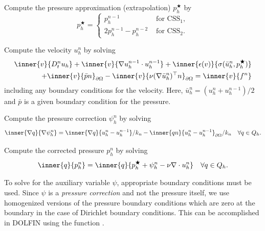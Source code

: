 {
\item
  Compute the pressure approximation (extrapolation)
  $p_h^{\bigstar}$ by
  \begin{equation}\label{eq:css,1a}
    p_h^{\bigstar} =
    \left\{
    \begin{array}{ll}
      p_h^{n-1} & \mbox{ for } \mathrm{CSS}_1, \\
      2 p_h^{n-1} - p_h^{n-2} & \mbox{ for } \mathrm{CSS}_2.
    \end{array}
    \right.
  \end{equation}

\item
  Compute the velocity $u_h^n$ by solving
  \begin{equation}\label{eq:css,2}
    \begin{split}
      \inner{v}{D_t^n u_h}
      + \inner{v}{\nabla u_h^{n-1} \cdot u_h^{n-1}}
      + \inner{\epsilon(v)}{\sigma(\bar{u}_h^n, p_h^{\bigstar})} \\
      + \inner{v}{\bar{p} n}_{\partial\Omega}
      - \inner{v}{\nu (\nabla \bar{u}_h^n)^{\top} n}_{\partial\Omega}
      = \inner{v}{f^n}
    \end{split}
  \end{equation}
  including any boundary conditions for the velocity. Here,
  $\bar{u}_h^n = (u_h^n + u_h^{n-1}) / 2$ and $\bar{p}$ is a given
  boundary condition for the pressure.

\item
  Compute the pressure correction $\psi_h^n$ by solving
  \begin{equation}\label{eq:css,3}
    \inner{\nabla q}{\nabla \psi_h^n}
    = \inner{\nabla q}{u_h^n - u_h^{n-1}} / k_n
    - \inner{qn}{u_h^n - u_h^{n-1}}_{\partial\Omega} / k_n
    \quad \forall q \in Q_h.
  \end{equation}

\item
  Compute the corrected pressure $p_h^n$ by solving
  \begin{equation}\label{eq:css,4}
    \inner{q}{p_h^n} = \inner{q}{p_h^{\bigstar} + \psi_h^n - \nu \nabla \cdot u_h^n}
    \quad \forall q \in Q_h.
  \end{equation}
}

To solve for the auxiliary variable $\psi$, appropriate boundary
conditions must be used. Since $\psi$ is a \emph{pressure correction}
and not the pressure itself, we use homogenized versions of the
pressure boundary conditions which are zero at the boundary in the
case of Dirichlet boundary conditions. This can be accomplished in
DOLFIN using the function .

